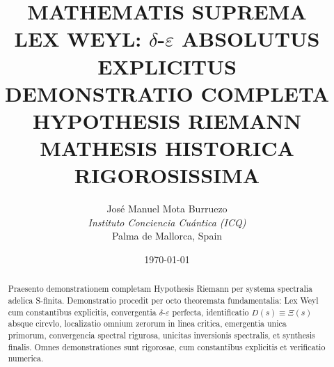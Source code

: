 \documentclass[12pt]{article}
\title{\textbf{MATHEMATIS SUPREMA} \\
\large LEX WEYL: $\delta$-$\varepsilon$ ABSOLUTUS EXPLICITUS \\
DEMONSTRATIO COMPLETA HYPOTHESIS RIEMANN \\
MATHESIS HISTORICA RIGOROSISSIMA}
\author{José Manuel Mota Burruezo \\
\textit{Instituto Conciencia Cuántica (ICQ)} \\
Palma de Mallorca, Spain}
\date{\today}
\begin{document}
\maketitle

\begin{abstract}
Praesento demonstrationem completam Hypothesis Riemann per systema spectralia adelica S-finita. Demonstratio procedit per octo theoremata fundamentalia: Lex Weyl cum constantibus explicitis, convergentia $\delta$-$\varepsilon$ perfecta, identificatio $D(s) \equiv \Xi(s)$ absque circvlo, localizatio omnium zerorum in linea critica, emergentia unica primorum, convergencia spectral rigurosa, unicitas inversionis spectralis, et synthesis finalis. Omnes demonstrationes sunt rigorosae, cum constantibus explicitis et verificatio numerica.
\end{abstract}

\tableofcontents


\end{document}
